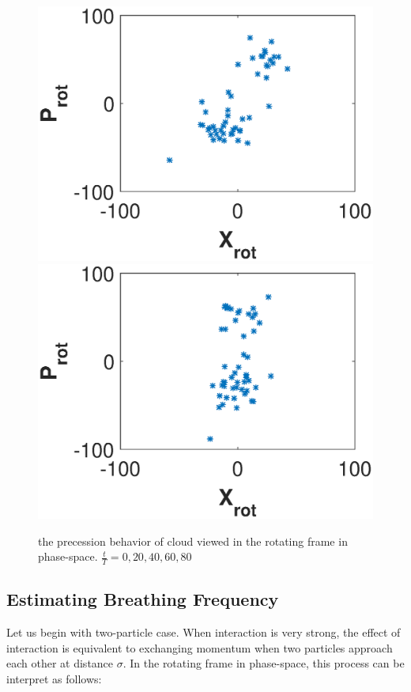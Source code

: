 \documentclass[aps,pre,twocolumn,groupedaddress]{revtex4-1}
\begin{document}
\begin{figure}
\includegraphics[scale=0.23]{ZhiyuPictures/10_18rotating_frame_t=60T_rev.eps}
\includegraphics[scale=0.23]{ZhiyuPictures/10_18rotating_frame_t=80T_rev.eps} 
\caption{the precession behavior of cloud viewed in the rotating frame in phase-space. $\frac{t}{T}=0,20,40,60,80$}
\label{fig:Breathingfrequency2_1}
\end{figure}



\subsection{Estimating Breathing Frequency}
Let us begin with two-particle case. When interaction is very strong, the effect of interaction is equivalent to exchanging momentum when two particles approach each other at distance $\sigma$. In the rotating frame in phase-space, this process can be interpret as follows:
\end{document}
